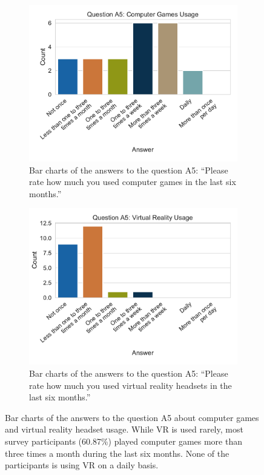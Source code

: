 \begin{figure}[H]
	\centering
	\begin{subfigure}{.48\linewidth}%
		\centering
		\includegraphics[width=\linewidth]{figures/evaluation/res_demo_q8_s3.pdf}
		\caption{Bar charts of the answers to the question A5: \enquote{Please rate how much you used computer games in the last six months.}}\label{fig:res-demo-q8-s3}
	\end{subfigure}%
	\hspace{0.03\linewidth}
	\begin{subfigure}{.48\linewidth}%
		\centering
		\includegraphics[width=\linewidth]{figures/evaluation/res_demo_q8_s4.pdf}
		\caption{Bar charts of the answers to the question A5: \enquote{Please rate how much you used virtual reality headsets in the last six months.}}\label{fig:res-demo-q8-s4}
	\end{subfigure}%
	\caption[Computer games and VR usage]{Bar charts of the answers to the question A5 about computer games and virtual reality headset usage. While \gls{VR} is used rarely, most survey participants (60.87\%) played computer games more than three times a month during the last six months. None of the participants is using \gls{VR} on a daily basis.}\label{fig:res-demo-q8}
\end{figure}

